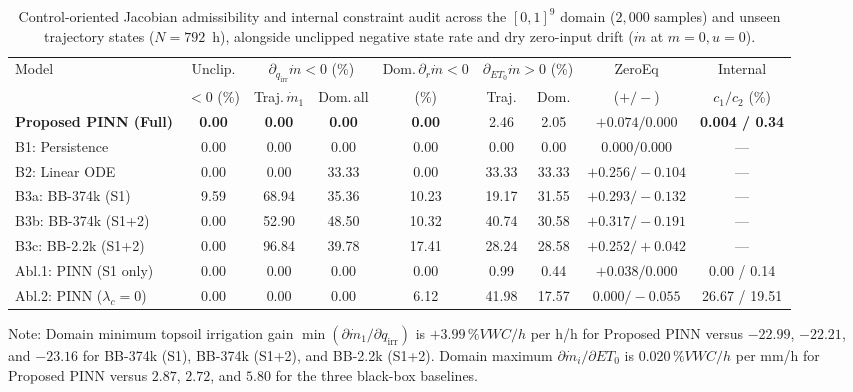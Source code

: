 \documentclass[pdflatex,sn-nature]{sn-jnl}%
\theoremstyle{thmstyleone}%
\theoremstyle{thmstyletwo}%
\theoremstyle{thmstylethree}%
\begin{document}
\begin{table}[!htbp]
\centering
\caption{Control-oriented Jacobian admissibility and internal constraint audit across the $[0,1]^9$ domain ($2{,}000$ samples) and unseen trajectory states ($N = 792$~h), alongside unclipped negative state rate and dry zero-input drift ($\dot{m}$ at $m=0, u=0$).}
\label{tab:admissibility_audit}
\fontsize{6.2}{7.8}\selectfont
\setlength{\tabcolsep}{0.9pt}
\begin{tabular*}{\textwidth}{@{\extracolsep{\fill}}lcccccccc@{}}
\toprule
Model & Unclip. & \multicolumn{2}{c}{$\partial_{q_{\mathrm{irr}}}\dot{m}<0$ (\%)} & Dom.\,$\partial_r\dot{m}{<}0$ & \multicolumn{2}{c}{$\partial_{ET_0}\dot{m}>0$ (\%)} & ZeroEq & Internal \\
\cmidrule(lr){3-4}\cmidrule(lr){6-7}
 & $<0$ (\%) & Traj.\,$\dot{m}_1$ & Dom.\,all & (\%) & Traj. & Dom. & ($+/-$) & $c_1 / c_2$ (\%) \\
\midrule
\textbf{Proposed PINN (Full)} & \textbf{0.00} & \textbf{0.00} & \textbf{0.00} & \textbf{0.00} & 2.46 & 2.05 & $+0.074/0.000$ & \textbf{0.004 / 0.34} \\
B1: Persistence & 0.00 & 0.00 & 0.00 & 0.00 & 0.00 & 0.00 & $0.000/0.000$ & --- \\
B2: Linear ODE & 0.00 & 0.00 & 33.33 & 0.00 & 33.33 & 33.33 & $+0.256/-0.104$ & --- \\
B3a: BB-374k (S1) & 9.59 & 68.94 & 35.36 & 10.23 & 19.17 & 31.55 & $+0.293/-0.132$ & --- \\
B3b: BB-374k (S1+2) & 0.00 & 52.90 & 48.50 & 10.32 & 40.74 & 30.58 & $+0.317/-0.191$ & --- \\
B3c: BB-2.2k (S1+2) & 0.00 & 96.84 & 39.78 & 17.41 & 28.24 & 28.58 & $+0.252/+0.042$ & --- \\
Abl.1: PINN (S1 only) & 0.00 & 0.00 & 0.00 & 0.00 & 0.99 & 0.44 & $+0.038/0.000$ & 0.00 / 0.14 \\
Abl.2: PINN ($\lambda_c{=}0$) & 0.00 & 0.00 & 0.00 & 6.12 & 41.98 & 17.57 & $0.000/-0.055$ & 26.67 / 19.51 \\
\bottomrule
\end{tabular*}
\begin{tablenotes}
\footnotesize
\item Note: Domain minimum topsoil irrigation gain $\min(\partial \dot{m}_1/\partial q_{\mathrm{irr}})$ is $+3.99\,\si{\%VWC/h}$ per \si{h/h} for Proposed PINN versus $-22.99$, $-22.21$, and $-23.16$ for BB-374k (S1), BB-374k (S1+2), and BB-2.2k (S1+2). Domain maximum $\partial \dot{m}_i/\partial ET_0$ is $0.020\,\si{\%VWC/h}$ per \si{mm/h} for Proposed PINN versus $2.87$, $2.72$, and $5.80$ for the three black-box baselines.
\end{tablenotes}
\end{table}
\end{document}
